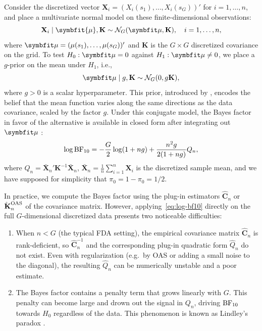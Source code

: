 Consider the discretized vector \(\mathbf X_i=(X_i(s_1), \dots, X_i(s_G))'\) for \(i=1,\dots, n\), and place a multivariate normal model on these finite-dimensional observations:
\[
\mathbf X_i\mid \symbfit{\mu}, \mathbf K \sim \mathcal N_G(\symbfit \mu, \mathbf K),\quad  i=1,\dots,n,
\]
where \(\symbfit\mu=(\mu(s_1), \dots, \mu(s_G))'\) and \(\mathbf K\) is the \(G\times G\) discretized covariance on the grid. To test \(H_0: \symbfit\mu = 0\) against \(H_1: \symbfit\mu \neq 0\), we place a \(g\)-prior on the mean under \(H_1\), i.e.,
\[
\symbfit \mu \mid g, \mathbf K \sim \mathcal{N}_G(0, g \mathbf K),
\]
where \(g>0\) is a scalar hyperparameter. This prior, introduced by \citet{zellner1986assessing}, encodes the belief that the mean function varies along the same directions as the data covariance, scaled by the factor \(g\). Under this conjugate model, the Bayes factor in favor of the alternative is available in closed form after integrating out \(\symbfit \mu\) \citep[for a similar computation, see][]{liang2008mixtures}:
\begin{equation}\label{eq:log-bf10}
\log \operatorname{\text{BF}}_{10} = -\frac{G}{2}\log(1+ng) + \frac{n^2 g}{2(1+ng)}Q_n,
\end{equation}
where \(Q_n = \bar{\mathbf X}_n' \mathbf K^{-1}\bar{\mathbf X}_n\), \(\bar{\mathbf X}_n = \frac{1}{n}\sum_{i=1}^n \mathbf X_i\) is the discretized sample mean, and we have supposed for simplicity that \(\pi_0=1-\pi_0=1/2\).

In practice, we compute the Bayes factor using the plug-in estimators \(\hat{\mathbf C}_n\) or \(\hatbfKnOAS\) of the covariance matrix. However, applying~\eqref{eq:log-bf10} directly on the full \(G\)-dimensional discretized data presents two noticeable difficulties:
\begin{enumerate}
  \item When \(n<G\) (the typical \acs{FDA} setting), the empirical covariance matrix \(\hat{\mathbf C}_n\) is rank-deficient, so \(\hat{\mathbf C}_n^{-1}\) and the corresponding plug-in quadratic form \(\hat Q_n\) do not exist. Even with regularization (e.g.\ by \acs{OAS} or adding a small noise to the diagonal), the resulting \(\hat Q_n\) can be numerically unstable and a poor estimate.
  \item The Bayes factor contains a penalty term that grows linearly with \(G\). This penalty can become large and drown out the signal in \(Q_n\), driving \(\operatorname{\text{BF}}_{10}\) towards \(H_0\) regardless of the data. This phenomenon is known as Lindley's paradox \citep{lindley1957statistical}.
\end{enumerate}


